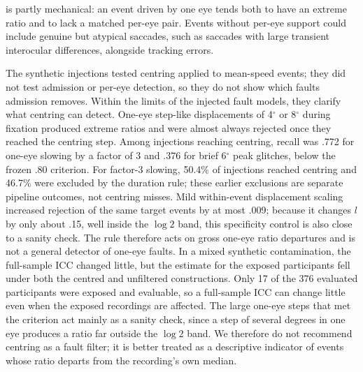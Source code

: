 is partly mechanical: an event driven by one eye tends both to have an extreme ratio and to lack a matched per-eye pair. Events without per-eye support could include genuine but atypical saccades, such as saccades with large transient interocular differences, alongside tracking errors.

The synthetic injections tested centring applied to mean-speed events; they did not test admission or per-eye detection, so they do not show which faults admission removes. Within the limits of the injected fault models, they clarify what centring can detect. One-eye step-like displacements of 4$^\circ$ or 8$^\circ$ during fixation produced extreme ratios and were almost always rejected once they reached the centring step. Among injections reaching centring, recall was .772 for one-eye slowing by a factor of 3 and .376 for brief 6$^\circ$ peak glitches, below the frozen .80 criterion. For factor-3 slowing, 50.4\% of injections reached centring and 46.7\% were excluded by the duration rule; these earlier exclusions are separate pipeline outcomes, not centring misses. Mild within-event displacement scaling increased rejection of the same target events by at most .009; because it changes $l$ by only about .15, well inside the $\log 2$ band, this specificity control is also close to a sanity check. The rule therefore acts on gross one-eye ratio departures and is not a general detector of one-eye faults. In a mixed synthetic contamination, the full-sample ICC changed little, but the estimate for the exposed participants fell under both the centred and unfiltered constructions. Only 17 of the 376 evaluated participants were exposed and evaluable, so a full-sample ICC can change little even when the exposed recordings are affected. The large one-eye steps that met the criterion act mainly as a sanity check, since a step of several degrees in one eye produces a ratio far outside the $\log 2$ band. We therefore do not recommend centring as a fault filter; it is better treated as a descriptive indicator of events whose ratio departs from the recording's own median.

